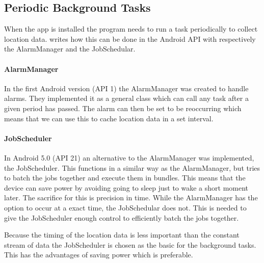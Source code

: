 \subsection{Periodic Background Tasks}\label{ssec:periodictasks}
When the app is installed the program needs to run a task periodically to collect location data.
 writes how this can be done in the Android API with respectively the AlarmManager and the JobSchedular.

\paragraph{AlarmManager}
In the first Android version (API 1) the AlarmManager was created to handle alarms.
They implemented it as a general class which can call any task after a given period has passed.
The alarm can then be set to be reoccurring which means that we can use this to cache location data in a set interval.

\paragraph{JobScheduler}
In Android 5.0 (API 21) an alternative to the AlarmManager was implemented, the JobScheduler.
This functions in a similar way as the AlarmManager, but tries to batch the jobs together and execute them in bundles.
This means that the device can save power by avoiding going to sleep just to wake a short moment later.
The sacrifice for this is precision in time. 
While the AlarmManager has the option to occur at a exact time, the JobSchedular does not.
This is needed to give the JobScheduler enough control to efficiently batch the jobs together.

Because the timing of the location data is less important than the constant stream of data the JobScheduler is chosen as the basic for the background tasks.
This has the advantages of saving power which is preferable.